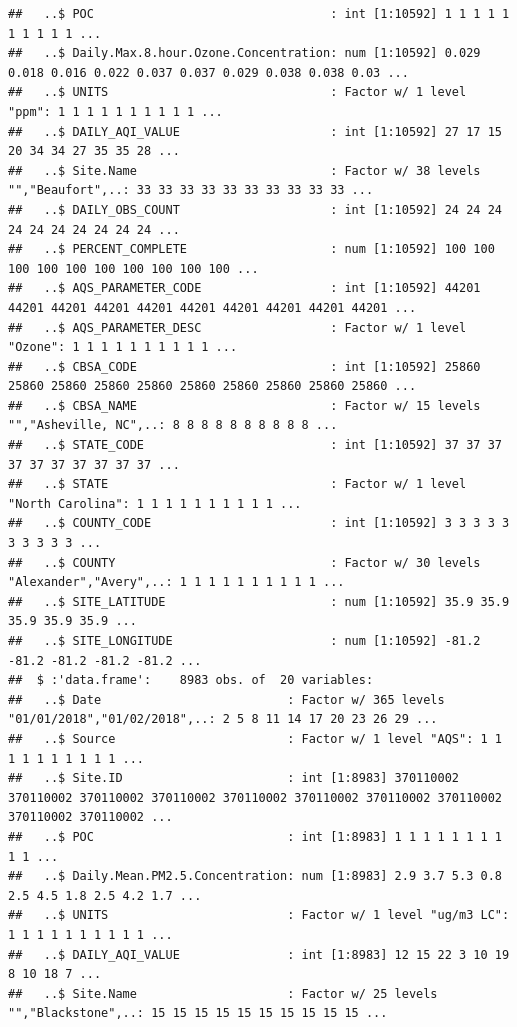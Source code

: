 \documentclass[
]{article}
\begin{document}
\begin{verbatim}
##   ..$ POC                                 : int [1:10592] 1 1 1 1 1 1 1 1 1 1 ...
##   ..$ Daily.Max.8.hour.Ozone.Concentration: num [1:10592] 0.029 0.018 0.016 0.022 0.037 0.037 0.029 0.038 0.038 0.03 ...
##   ..$ UNITS                               : Factor w/ 1 level "ppm": 1 1 1 1 1 1 1 1 1 1 ...
##   ..$ DAILY_AQI_VALUE                     : int [1:10592] 27 17 15 20 34 34 27 35 35 28 ...
##   ..$ Site.Name                           : Factor w/ 38 levels "","Beaufort",..: 33 33 33 33 33 33 33 33 33 33 ...
##   ..$ DAILY_OBS_COUNT                     : int [1:10592] 24 24 24 24 24 24 24 24 24 24 ...
##   ..$ PERCENT_COMPLETE                    : num [1:10592] 100 100 100 100 100 100 100 100 100 100 ...
##   ..$ AQS_PARAMETER_CODE                  : int [1:10592] 44201 44201 44201 44201 44201 44201 44201 44201 44201 44201 ...
##   ..$ AQS_PARAMETER_DESC                  : Factor w/ 1 level "Ozone": 1 1 1 1 1 1 1 1 1 1 ...
##   ..$ CBSA_CODE                           : int [1:10592] 25860 25860 25860 25860 25860 25860 25860 25860 25860 25860 ...
##   ..$ CBSA_NAME                           : Factor w/ 15 levels "","Asheville, NC",..: 8 8 8 8 8 8 8 8 8 8 ...
##   ..$ STATE_CODE                          : int [1:10592] 37 37 37 37 37 37 37 37 37 37 ...
##   ..$ STATE                               : Factor w/ 1 level "North Carolina": 1 1 1 1 1 1 1 1 1 1 ...
##   ..$ COUNTY_CODE                         : int [1:10592] 3 3 3 3 3 3 3 3 3 3 ...
##   ..$ COUNTY                              : Factor w/ 30 levels "Alexander","Avery",..: 1 1 1 1 1 1 1 1 1 1 ...
##   ..$ SITE_LATITUDE                       : num [1:10592] 35.9 35.9 35.9 35.9 35.9 ...
##   ..$ SITE_LONGITUDE                      : num [1:10592] -81.2 -81.2 -81.2 -81.2 -81.2 ...
##  $ :'data.frame':    8983 obs. of  20 variables:
##   ..$ Date                          : Factor w/ 365 levels "01/01/2018","01/02/2018",..: 2 5 8 11 14 17 20 23 26 29 ...
##   ..$ Source                        : Factor w/ 1 level "AQS": 1 1 1 1 1 1 1 1 1 1 ...
##   ..$ Site.ID                       : int [1:8983] 370110002 370110002 370110002 370110002 370110002 370110002 370110002 370110002 370110002 370110002 ...
##   ..$ POC                           : int [1:8983] 1 1 1 1 1 1 1 1 1 1 ...
##   ..$ Daily.Mean.PM2.5.Concentration: num [1:8983] 2.9 3.7 5.3 0.8 2.5 4.5 1.8 2.5 4.2 1.7 ...
##   ..$ UNITS                         : Factor w/ 1 level "ug/m3 LC": 1 1 1 1 1 1 1 1 1 1 ...
##   ..$ DAILY_AQI_VALUE               : int [1:8983] 12 15 22 3 10 19 8 10 18 7 ...
##   ..$ Site.Name                     : Factor w/ 25 levels "","Blackstone",..: 15 15 15 15 15 15 15 15 15 15 ...

\end{verbatim}
\end{document}

